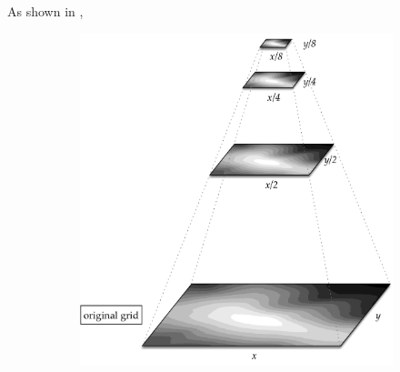 As shown in , 
\begin{figure}
  \centering
  \begin{subfigure}[b]{0.65\linewidth}
    \centering
    \includegraphics[width=\textwidth]{figs/pyramids.pdf}
    \caption{}
  \end{subfigure}
  \qquad%
  \begin{subfigure}[b]{0.2\linewidth}
    \centering

\end{subfigure}
\end{figure}

